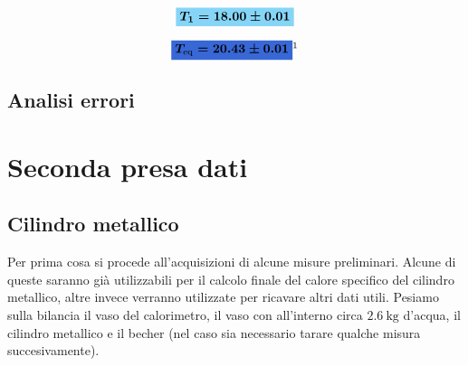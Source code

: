 \documentclass{article}
\newcommand{\azzurro}[1]{\colorbox{mylightblue}{$\displaystyle #1$}}
\newcommand{\blu}[1]{\colorbox{myblue}{$\displaystyle #1$}}
\begin{document}
\begin{center}
\begin{figure}[H]
			\end{figure}
		\end{center}
		\begin{minipage}{\textwidth}
		\[ 
		\azzurro{\boldsymbol{T_{1} = 18.00 \pm	0.01} }
		\]
		\end{minipage}
		\begin{minipage}{\textwidth}
			\[ 
			\blu{\boldsymbol{T_{\text{eq}} = 20.43 \pm 0.01} }\footnotemark
			\]
		\end{minipage}
		
		
		
			
	\subsection{Analisi errori}
	
	\newpage
	\section{Seconda presa dati}
	\subsection{Cilindro metallico}
	Per prima cosa si procede all'acquisizioni di alcune misure preliminari. Alcune di queste saranno già utilizzabili per il calcolo finale del calore specifico del cilindro metallico, altre invece verranno utilizzate per ricavare altri dati utili. Pesiamo sulla bilancia il vaso del calorimetro, il vaso con all'interno circa \(2.6 \SI{}{\kilogram}\) d'acqua, il cilindro metallico e il becher (nel caso sia necessario tarare qualche misura succesivamente).
	
\end{document}
